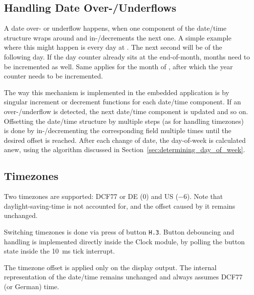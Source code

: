 \subsection{Handling Date Over-/Underflows}

A date over- or underflow happens, when one component of the date/time structure wraps around and in-/decrements the next one. A simple example where this might happen is every day at . The next second will be  of the following day. If the day counter already sits at the end-of-month, months need to be incremented as well. Same applies for the month of , after which the year counter needs to be incremented.

The way this mechanism is implemented in the embedded application is by singular increment or decrement functions for each date/time component. If an over-/underflow is detected, the next date/time component is updated and so on. Offsetting the date/time structure by multiple steps (as for handling timezones) is done by in-/decrementing the corresponding field multiple times until the desired offset is reached. After each change of date, the day-of-week is calculated anew, using the algorithm discussed in Section~\ref{sec:determining_day_of_week}.

\subsection{Timezones}

Two timezones are supported: DCF77 or DE (\num[explicit-sign=+]{0}) and US (\num{-6}). Note that daylight-saving-time is not accounted for, and the offset caused by it remains unchanged.

Switching timezones is done via press of button \texttt{H.3}. Button debouncing and handling is implemented directly inside the Clock module, by polling the button state inside the \SI{10}{\milli\second} tick interrupt.

The timezone offset is applied only on the display output. The internal representation of the date/time remains unchanged and always assumes DCF77 (or German) time.
